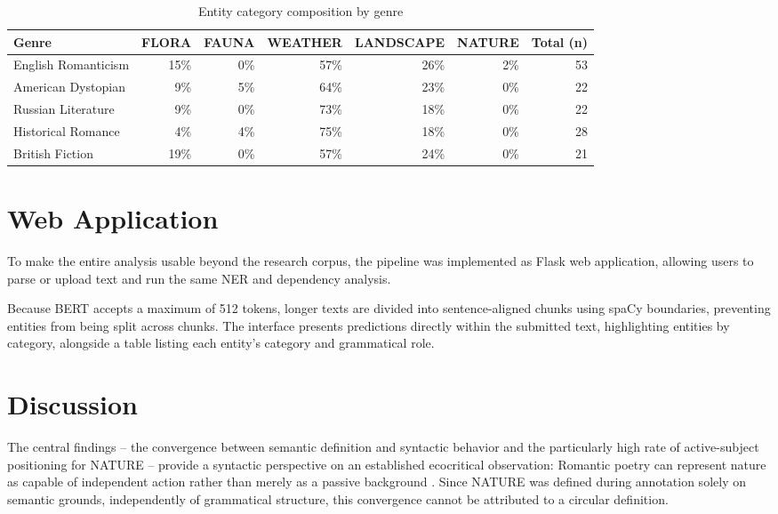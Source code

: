 \documentclass[11pt]{article}
\begin{document}
\begin{table}[t]
\centering
\caption{Entity category composition by genre}
\label{tab:genre_composition}
\vspace{4pt}
\begin{tabular}{lrrrrrr}
\toprule
\textbf{Genre} & \textbf{FLORA} & \textbf{FAUNA} & \textbf{WEATHER} & \textbf{LANDSCAPE} & \textbf{NATURE} & \textbf{Total (n)} \\
\midrule
English Romanticism & 15\% & 0\% & 57\% & 26\% & 2\% & 53 \\
American Dystopian  & 9\%  & 5\% & 64\% & 23\% & 0\% & 22 \\
Russian Literature  & 9\%  & 0\% & 73\% & 18\% & 0\% & 22 \\
Historical Romance  & 4\%  & 4\% & 75\% & 18\% & 0\% & 28 \\
British Fiction     & 19\% & 0\% & 57\% & 24\% & 0\% & 21 \\
\bottomrule
\end{tabular}
\end{table}


\section{Web Application}
To make the entire analysis usable beyond the research corpus, the pipeline was implemented as Flask web application, allowing users to parse or upload text and run the same NER and dependency analysis.

Because BERT accepts a maximum of 512 tokens, longer texts are divided into sentence-aligned chunks using spaCy boundaries, preventing entities from being split across chunks. The interface presents predictions directly within the submitted text, highlighting entities by category, alongside a table listing each entity’s category and grammatical role.

\section{Discussion}
The central findings – the convergence between semantic definition and syntactic behavior and the particularly high rate of active-subject positioning for NATURE – provide a syntactic perspective on an established ecocritical observation: Romantic poetry can represent nature as capable of independent action rather than merely as a passive background \cite{bate:91}. Since NATURE was defined during annotation solely on semantic grounds, independently of grammatical structure, this convergence cannot be attributed to a circular definition.
\end{document}
